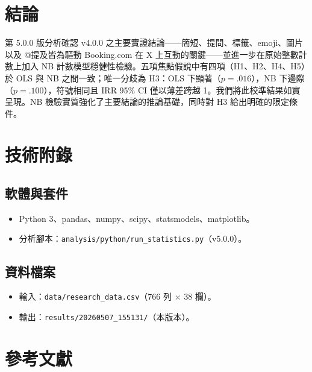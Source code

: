 \documentclass[12pt,a4paper]{ctexart}
\begin{document}
\section{結論}

第 5.0.0 版分析確認 v4.0.0 之主要實證結論——簡短、提問、標籤、emoji、圖片以及 @提及皆為驅動 Booking.com 在 X 上互動的關鍵——並進一步在原始整數計數上加入 NB 計數模型穩健性檢驗。五項焦點假說中有四項（H1、H2、H4、H5）於 OLS 與 NB 之間一致；唯一分歧為 H3：OLS 下顯著（$p=.016$），NB 下邊際（$p=.100$），符號相同且 IRR 95\% CI 僅以薄差跨越 1。我們將此校準結果如實呈現。NB 檢驗實質強化了主要結論的推論基礎，同時對 H3 給出明確的限定條件。

\appendix
\section{技術附錄}

\subsection{軟體與套件}
\begin{itemize}
    \item Python 3、pandas、numpy、scipy、statsmodels、matplotlib。
    \item 分析腳本：\texttt{analysis/python/run\_statistics.py}（v5.0.0）。
\end{itemize}

\subsection{資料檔案}
\begin{itemize}
    \item 輸入：\texttt{data/research\_data.csv}（766 列 $\times$ 38 欄）。
    \item 輸出：\texttt{results/20260507\_155131/}（本版本）。
\end{itemize}

\section*{參考文獻}
\end{document}
